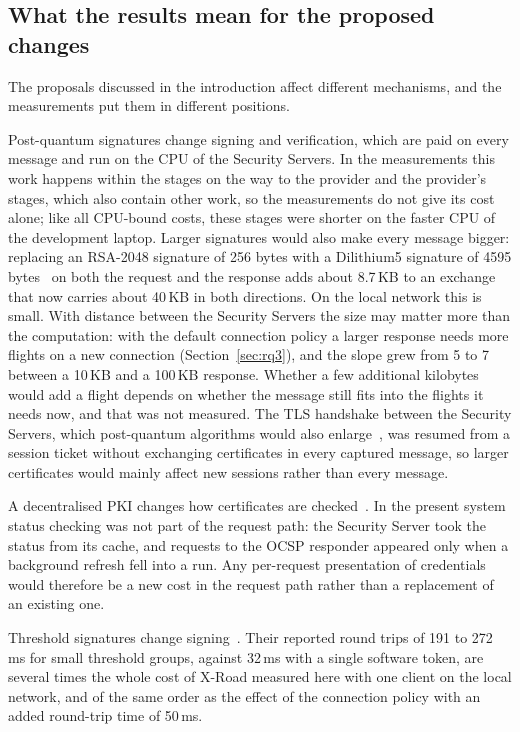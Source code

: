 \documentclass[conference,a4paper]{IEEEtran}
\begin{document}
\subsection{What the results mean for the proposed changes}\label{sec:pq}

The proposals discussed in the introduction affect different mechanisms, and the measurements put
them in different positions.

Post-quantum signatures change signing and verification, which are paid on every message and run on
the CPU of the Security Servers. In the measurements this work happens within the stages on the way to
the provider and the provider's stages, which also contain other work, so the measurements do not
give its cost alone; like all CPU-bound costs, these stages were shorter on the faster CPU of the
development laptop. Larger signatures would
also make every message bigger: replacing an RSA-2048 signature of 256 bytes with a Dilithium5
signature of 4595 bytes~\cite{snetkov2023} on both the request and the response adds about 8.7\,KB to
an exchange that now carries about 40\,KB in both directions. On the local network this is small. With
distance between the Security Servers the size may matter more than the computation: with the default
connection policy a larger response needs more flights on a new connection (Section~\ref{sec:rq3}), and the
slope grew from 5 to 7 between a 10\,KB and a 100\,KB response. Whether a few additional kilobytes
would add a flight depends on whether the message still fits into the flights it needs now, and that
was not measured. The TLS handshake between the Security
Servers, which post-quantum algorithms would also enlarge~\cite{bakhtina2026pqc}, was resumed from a
session ticket without exchanging certificates in every captured message, so larger certificates would
mainly affect new sessions rather than every message.

A decentralised PKI changes how certificates are checked~\cite{bakhtina2023ares}. In the present
system status checking was not part of the request path: the Security Server took the status from
its cache, and requests to the OCSP responder appeared only when a background refresh fell into a
run. Any per-request
presentation of credentials would therefore be a new cost in the request path rather than a
replacement of an existing one.

Threshold signatures change signing~\cite{bakhtina2026ijis}. Their reported round trips of 191 to
272\,ms for small threshold groups, against 32\,ms with a single software token, are several times the
whole cost of X-Road measured here with one client on the local network, and of the same order as the
effect of the connection policy with an added round-trip time of 50\,ms.
\end{document}
